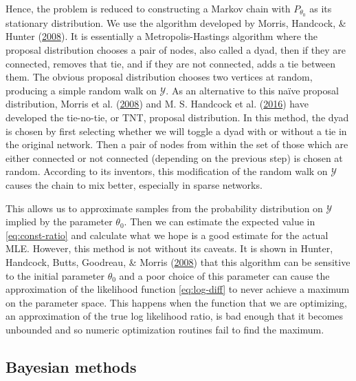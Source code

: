 \documentclass[12pt,twoside]{reedthesis}
\theoremstyle{definition}
\theoremstyle{definition}
\theoremstyle{remark}
\begin{document}
Hence, the problem is reduced to constructing a Markov chain with
\(P_{\theta_0}\) as its stationary distribution. We use the algorithm
developed by Morris, Handcock, \& Hunter
(\protect\hyperlink{ref-Morris2008}{2008}). It is essentially a
Metropolis-Hastings algorithm where the proposal distribution chooses a
pair of nodes, also called a dyad, then if they are connected, removes
that tie, and if they are not connected, adds a tie between them. The
obvious proposal distribution chooses two vertices at random, producing
a simple random walk on \(\mathcal{Y}\). As an alternative to this naïve
proposal distribution, Morris et al.
(\protect\hyperlink{ref-Morris2008}{2008}) and M. S. Handcock et al.
(\protect\hyperlink{ref-Handcock2016a}{2016}) have developed the
tie-no-tie, or TNT, proposal distribution. In this method, the dyad is
chosen by first selecting whether we will toggle a dyad with or without
a tie in the original network. Then a pair of nodes from within the set
of those which are either connected or not connected (depending on the
previous step) is chosen at random. According to its inventors, this
modification of the random walk on \(\mathcal{Y}\) causes the chain to
mix better, especially in sparse networks.

This allows us to approximate samples from the probability distribution
on \(\mathcal{Y}\) implied by the parameter \(\theta_0\). Then we can
estimate the expected value in \eqref{eq:const-ratio} and calculate what
we hope is a good estimate for the actual MLE. However, this method is
not without its caveats. It is shown in Hunter, Handcock, Butts,
Goodreau, \& Morris (\protect\hyperlink{ref-Hunter2008}{2008}) that this
algorithm can be sensitive to the initial parameter \(\theta_0\) and a
poor choice of this parameter can cause the approximation of the
likelihood function \eqref{eq:log-diff} to never achieve a maximum on the
parameter space. This happens when the function that we are optimizing,
an approximation of the true log likelihood ratio, is bad enough that it
becomes unbounded and so numeric optimization routines fail to find the
maximum.

\subsection{Bayesian methods}\label{bayesian-methods}
\end{document}
